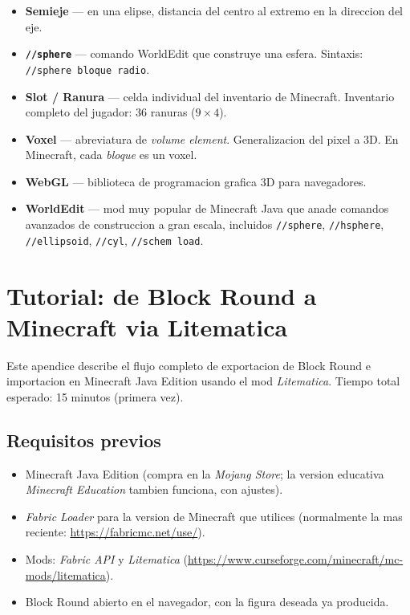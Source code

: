 \documentclass[12pt,a4paper]{scrartcl}
\newcommand{\code}[1]{\texttt{\small #1}}
\newcommand{\acc}[1]{\textcolor{accent}{\textbf{#1}}}
\newcommand{\cmd}[1]{\textcolor{earth}{\texttt{\small #1}}}
\begin{document}
\begin{itemize}[leftmargin=1.4em,itemsep=0.3em,topsep=0.3em]
  \item \acc{Semieje} --- en una elipse, distancia del centro al extremo en la direccion del eje.
  \item \acc{\code{//sphere}} --- comando WorldEdit que construye una esfera. Sintaxis: \cmd{//sphere bloque radio}.
  \item \acc{Slot / Ranura} --- celda individual del inventario de Minecraft. Inventario completo del jugador: 36 ranuras ($9 \times 4$).
  \item \acc{Voxel} --- abreviatura de \emph{volume element}. Generalizacion del pixel a 3D. En Minecraft, cada \emph{bloque} es un voxel.
  \item \acc{WebGL} --- biblioteca de programacion grafica 3D para navegadores.
  \item \acc{WorldEdit} --- mod muy popular de Minecraft Java que anade comandos avanzados de construccion a gran escala, incluidos \cmd{//sphere}, \cmd{//hsphere}, \cmd{//ellipsoid}, \cmd{//cyl}, \cmd{//schem load}.
\end{itemize}

\newpage
\section{Tutorial: de Block Round a Minecraft via Litematica}\label{ap:litematica}

Este apendice describe el flujo completo de exportacion de Block Round e importacion en Minecraft Java Edition usando el mod \emph{Litematica}. Tiempo total esperado: 15 minutos (primera vez).

\subsection{Requisitos previos}
\begin{itemize}[leftmargin=1.3em,itemsep=0.1em,topsep=0.2em,nosep]
  \item Minecraft Java Edition (compra en la \emph{Mojang Store}; la version educativa \emph{Minecraft Education} tambien funciona, con ajustes).
  \item \emph{Fabric Loader} para la version de Minecraft que utilices (normalmente la mas reciente: \url{https://fabricmc.net/use/}).
  \item Mods: \emph{Fabric API} y \emph{Litematica} (\url{https://www.curseforge.com/minecraft/mc-mods/litematica}).
  \item Block Round abierto en el navegador, con la figura deseada ya producida.
\end{itemize}
\end{document}
